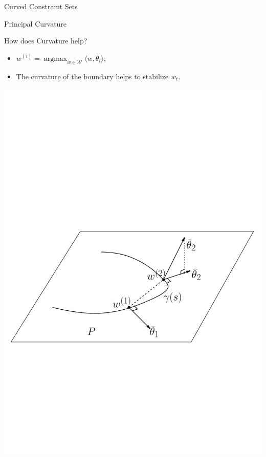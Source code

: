 \documentclass[final]{beamer} %
\newcommand{\cW}{\mathcal{W}}
\newcommand{\ip}[1]{\langle#1\rangle}
\DeclareMathOperator*{\argmax}{argmax}
\begin{document}
\begin{frame}[c]
\begin{columns}[t,totalwidth=\textwidth]
\begin{column}{.32\textwidth}
\begin{block}{Curved Constraint Sets}
\begin{minipage}{.9\linewidth}
\begin{block}{Principal Curvature}
\begin{itemize}
\begin{itemize}
						\end{itemize}
					\end{itemize}
				\end{block}
			\end{minipage}
			\begin{minipage}{0.95\textwidth}
				\begin{block}{How does Curvature help?}
					\vspace{-0.5cm}
					\begin{minipage}[b]{0.5\textwidth}
						\begin{itemize}
							\item $w^{(i)} = {\displaystyle \argmax_{w\in\cW}} \ip{w,\theta_i}$;\vspace{0.2cm}
							\item The curvature of the boundary helps to stabilize $w_t$.\vspace{1cm}
						\end{itemize}
					\end{minipage}
					\begin{minipage}[b]{0.4\textwidth}
					{\includegraphics[width=\textwidth, trim={4.8cm 1cm 3cm 0},clip]{figures/GaussmapPro}}

\end{minipage}
\end{block}
\end{minipage}
\end{block}
\end{column}
\end{columns}
\end{frame}
\end{document}
